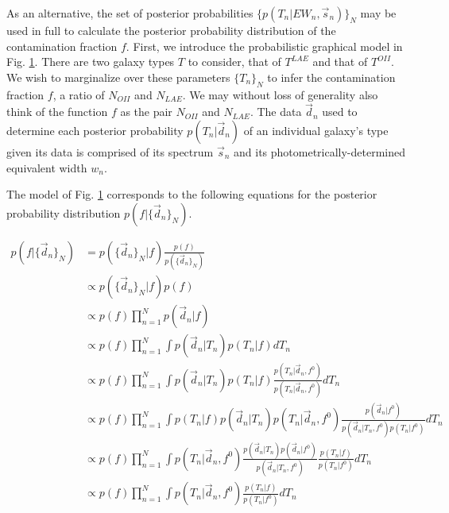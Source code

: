 \documentclass[12pt, onecolumn]{emulateapj}
\begin{document}
As an alternative, the set of posterior probabilities $\{p(T_{n}|EW_{n},\vec{s}_{n})\}_{N}$ may be used in full to calculate the posterior probability distribution of the contamination fraction $f$.  First, we introduce the probabilistic graphical model in Fig. \ref{fig:fT}.  There are two galaxy types $T$ to consider, that of $T^{LAE}$ and that of $T^{OII}$.  We wish to marginalize over these parameters $\{T_{n}\}_{N}$ to infer the contamination fraction $f$, a ratio of $N_{OII}$ and $N_{LAE}$.  We may without loss of generality also think of the function $f$ as the pair $N_{OII}$ and $N_{LAE}$.  The data $\vec{d}_{n}$ used to determine each posterior probability $p(T_{n}|\vec{d}_{n})$ of an individual galaxy's type given its data is comprised of its spectrum $\vec{s}_{n}$ and its photometrically-determined equivalent width $w_{n}$.

\begin{figure}
\vspace{0.5cm}
\begin{center}
\caption{}
\label{fig:fT}
\end{center}
\end{figure}

The model of Fig. \ref{fig:fT} corresponds to the following equations for the posterior probability distribution $p(f|\{\vec{d}_{n}\}_{N})$.  

\begin{align*}
p(f|\{\vec{d}_{n}\}_{N}) &= p(\{\vec{d}_{n}\}_{N}|f)\frac{p(f)}{p(\{\vec{d}_{n}\}_{N})}\\
&\propto p(\{\vec{d}_{n}\}_{N}|f)p(f)\\
&\propto p(f)\prod_{n=1}^{N}p(\vec{d}_{n}|f)\\
&\propto p(f)\prod_{n=1}^{N}\int p(\vec{d}_{n}|T_{n})p(T_{n}|f)dT_{n}\\
&\propto p(f)\prod_{n=1}^{N}\int p(\vec{d}_{n}|T_{n})p(T_{n}|f)\frac{p(T_{n}|\vec{d}_{n},f^{0})}{p(T_{n}|\vec{d}_{n},f^{0})}dT_{n}\\
&\propto p(f)\prod_{n=1}^{N}\int p(T_{n}|f)p(\vec{d}_{n}|T_{n})p(T_{n}|\vec{d}_{n},f^{0})\frac{p(\vec{d}_{n}|f^{0})}{p(\vec{d}_{n}|T_{n},f^{0})p(T_{n}|f^{0})}dT_{n}\\
&\propto p(f)\prod_{n=1}^{N}\int p(T_{n}|\vec{d}_{n},f^{0})\frac{p(\vec{d}_{n}|T_{n})p(\vec{d}_{n}|f^{0})}{p(\vec{d}_{n}|T_{n},f^{0})}\frac{p(T_{n}|f)}{p(T_{n}|f^{0})}dT_{n}\\
&\propto p(f)\prod_{n=1}^{N}\int p(T_{n}|\vec{d}_{n},f^{0})\frac{p(T_{n}|f)}{p(T_{n}|f^{0})}dT_{n}
\end{align*}
\end{document}
